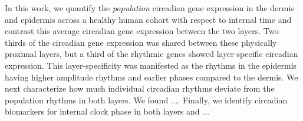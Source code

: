 In this work, we quantify the \emph{population} circadian gene  expression in the dermis and epidermis across a healthy human cohort with respect to internal time and contrast this average circadian gene expression between the two layers. Two-thirds of the circadian gene expression was shared between these physically proximal layers, but a third of the rhythmic genes showed layer-specific circadian expression. This layer-specificity was manifested as the rhythms in the epidermis having higher amplitude rhythms and earlier phases compared to the dermis.  We next characterize how much individual circadian rhythms deviate from the population rhythms in both layers. We found .... Finally, we identify circadian biomarkers for internal clock phase in both layers and ...




